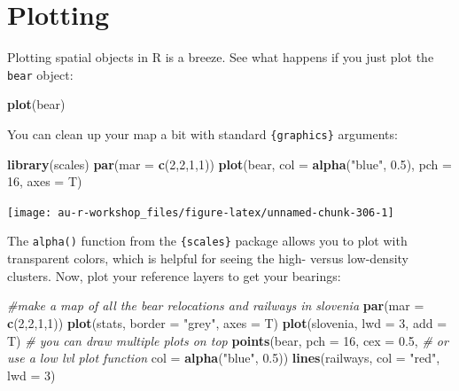 \documentclass[]{book}
\newenvironment{Shaded}{\begin{snugshade}}{\end{snugshade}}
\newcommand{\KeywordTok}[1]{\textcolor[rgb]{0.13,0.29,0.53}{\textbf{#1}}}
\newcommand{\DataTypeTok}[1]{\textcolor[rgb]{0.13,0.29,0.53}{#1}}
\newcommand{\DecValTok}[1]{\textcolor[rgb]{0.00,0.00,0.81}{#1}}
\newcommand{\FloatTok}[1]{\textcolor[rgb]{0.00,0.00,0.81}{#1}}
\newcommand{\StringTok}[1]{\textcolor[rgb]{0.31,0.60,0.02}{#1}}
\newcommand{\CommentTok}[1]{\textcolor[rgb]{0.56,0.35,0.01}{\textit{#1}}}
\newcommand{\NormalTok}[1]{#1}
\theoremstyle{definition}
\theoremstyle{definition}
\theoremstyle{definition}
\theoremstyle{remark}
\begin{document}
\section{Plotting}\label{SpatPlot}

Plotting spatial objects in R is a breeze. See what happens if you just
plot the \texttt{bear} object:

\begin{Shaded}
\begin{Highlighting}[]
\KeywordTok{plot}\NormalTok{(bear)}
\end{Highlighting}
\end{Shaded}

You can clean up your map a bit with standard \texttt{\{graphics\}}
arguments:

\begin{Shaded}
\begin{Highlighting}[]
\KeywordTok{library}\NormalTok{(scales)}
\KeywordTok{par}\NormalTok{(}\DataTypeTok{mar =} \KeywordTok{c}\NormalTok{(}\DecValTok{2}\NormalTok{,}\DecValTok{2}\NormalTok{,}\DecValTok{1}\NormalTok{,}\DecValTok{1}\NormalTok{))}
\KeywordTok{plot}\NormalTok{(bear, }\DataTypeTok{col =} \KeywordTok{alpha}\NormalTok{(}\StringTok{"blue"}\NormalTok{, }\FloatTok{0.5}\NormalTok{), }\DataTypeTok{pch =} \DecValTok{16}\NormalTok{, }\DataTypeTok{axes =}\NormalTok{ T)}
\end{Highlighting}
\end{Shaded}

\begin{center}\texttt{[image: au-r-workshop\_files/figure-latex/unnamed-chunk-306-1]} \end{center}

The \texttt{alpha()} function from the \texttt{\{scales\}} package
\citep{R-scales} allows you to plot with transparent colors, which is
helpful for seeing the high- versus low-density clusters. Now, plot your
reference layers to get your bearings:

\begin{Shaded}
\begin{Highlighting}[]
\CommentTok{#make a map of all the bear relocations and railways in slovenia}
\KeywordTok{par}\NormalTok{(}\DataTypeTok{mar =} \KeywordTok{c}\NormalTok{(}\DecValTok{2}\NormalTok{,}\DecValTok{2}\NormalTok{,}\DecValTok{1}\NormalTok{,}\DecValTok{1}\NormalTok{))}
\KeywordTok{plot}\NormalTok{(stats, }\DataTypeTok{border =} \StringTok{"grey"}\NormalTok{, }\DataTypeTok{axes =}\NormalTok{ T)}
\KeywordTok{plot}\NormalTok{(slovenia, }\DataTypeTok{lwd =} \DecValTok{3}\NormalTok{, }\DataTypeTok{add =}\NormalTok{ T)     }\CommentTok{# you can draw multiple plots on top}
\KeywordTok{points}\NormalTok{(bear, }\DataTypeTok{pch =} \DecValTok{16}\NormalTok{, }\DataTypeTok{cex =} \FloatTok{0.5}\NormalTok{,    }\CommentTok{# or use a low lvl plot function}
       \DataTypeTok{col =} \KeywordTok{alpha}\NormalTok{(}\StringTok{"blue"}\NormalTok{, }\FloatTok{0.5}\NormalTok{))}
\KeywordTok{lines}\NormalTok{(railways, }\DataTypeTok{col =} \StringTok{"red"}\NormalTok{, }\DataTypeTok{lwd =} \DecValTok{3}\NormalTok{) }
\end{Highlighting}
\end{Shaded}
\end{document}
